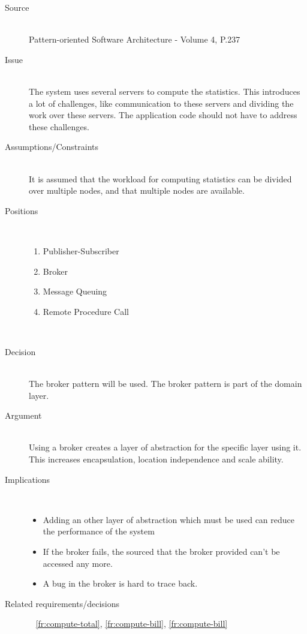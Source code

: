 \begin{description}
\item [Source]~\\
Pattern-oriented Software Architecture - Volume 4, P.237 \cite{wiley-4}

\item [Issue]~\\
The system uses several servers to compute the statistics. This introduces a lot of challenges, like communication to these servers and dividing the work over these servers. The application code should not have to address these challenges.

\item [Assumptions/Constraints]~\\
It is assumed that the workload for computing statistics can be divided over multiple nodes, and that multiple nodes are available.

\item [Positions]~
\begin{enumerate}
\item Publisher-Subscriber
\item Broker 
\item Message Queuing %
\item Remote Procedure Call
\end{enumerate}
~\\[-1.5cm]

\item [Decision]~\\
The broker pattern will be used. The broker pattern is part of the domain layer.

\item [Argument]~\\
Using a broker creates a layer of abstraction for the specific layer using it. This increases encapsulation, location independence and scale ability.

\item [Implications]~\\ 
\begin{itemize}
\item Adding an other layer of abstraction which must be used can reduce the performance of the system
\item If the broker fails, the sourced that the broker provided can't be accessed any more.
\item A bug in the broker is hard to trace back.
\end{itemize}

\item [Related requirements/decisions]~
\ref{fr:compute-total}, \ref{fr:compute-bill}, \ref{fr:compute-bill}
\end{description}


